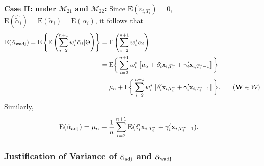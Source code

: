 \documentclass[11pt]{article}
\def\mbf#1{\mathbf{#1}} %
\def\mrm#1{\mathrm{#1}} %
\def\mc#1{\mathcal{#1}} %
\def\E#1{\mathrm{E}(#1)} %
\theoremstyle{definition}
\begin{document}
\noindent \textbf{Case II: under $\mc{M}_{21}$ and $\mc{M}_{22}$:} Since $\E{\tilde{\varepsilon}_{i, T_i}}=0$, $\E{\hat{\tilde{\alpha}}_{i}}=\E{\tilde{\alpha}_{i}}=\E{\alpha_{i}}$, it follows that
  \begin{align*}
   \E{\hat{\alpha}_{\rm wadj}}= \mrm{E}\left\{\mrm{E}\left(\sum_{i=2}^{n+1} w_i^*\hat{\alpha}_i|\Theta\right)\right\}
   &= \mrm{E}\left( \sum_{i=2}^{n+1} w_i^*\alpha_i\right)\\
   &= \mrm{E}\bigg\{ \sum_{i=2}^{n+1} w_i^*\left[\mu_{\alpha}+\delta_{i}'\mbf{x}_{i, T_i^*}+\gamma_i'\mbf{x}_{i, T^*_i-1}\right]\bigg\}\\
   &=\mu_{\alpha}+\mrm{E}\bigg\{ \sum_{i=2}^{n+1} w_i^*\left[\delta_{i}'\mbf{x}_{i, T_i^*}+\gamma_i'\mbf{x}_{i, T^*_i-1}\right]\bigg\}.\tag{$\mbf{W}\in \mc{W}$}
   \end{align*}
Similarly,
  \begin{align*}
   \E{\hat{\alpha}_{\rm adj}}
   &=\mu_{\alpha}+\frac{1}{n}\sum_{i=2}^{n+1} \E{\delta_{i}'\mbf{x}_{i, T_i^*}+\gamma_i'\mbf{x}_{i, T^*_i-1}}.
   \end{align*}


\subsubsection{Justification of Variance of $\hat{\alpha}_{\rm adj}$ and $\hat{\alpha}_{\rm wadj}$}
\label{var}
\end{document}
